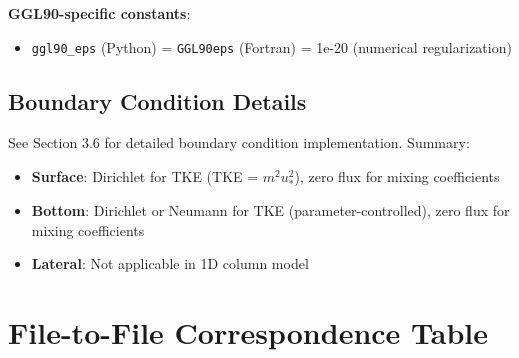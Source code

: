 \documentclass[11pt]{article}
\begin{document}
\textbf{GGL90-specific constants}:
\begin{itemize}
    \item \verb|ggl90_eps| (Python) = \verb|GGL90eps| (Fortran) = 1e-20 (numerical regularization)
\end{itemize}

\subsection{Boundary Condition Details}

See Section 3.6 for detailed boundary condition implementation. Summary:

\begin{itemize}
    \item \textbf{Surface}: Dirichlet for TKE (TKE = $m^2 u_*^2$), zero flux for mixing coefficients
    \item \textbf{Bottom}: Dirichlet or Neumann for TKE (parameter-controlled), zero flux for mixing coefficients
    \item \textbf{Lateral}: Not applicable in 1D column model
\end{itemize}

\section{File-to-File Correspondence Table}
\label{sec:file_correspondence}
\end{document}
